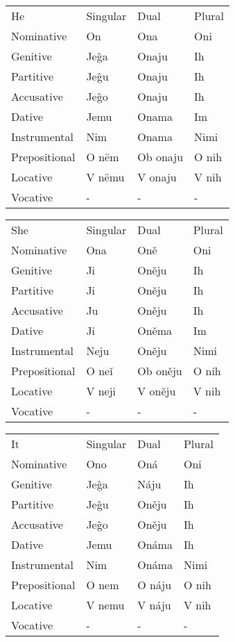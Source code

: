 \begin{table}
	\begin{tabular}{llll}
		He & Singular & Dual & Plural \\
		Nominative & On & Ona & Oni \\
		Genitive & Jeĝa & Onaju & Ih \\
		Partitive & Jeĝu & Onaju & Ih \\
		Accusative & Jeĝo & Onaju & Ih \\
		Dative & Jemu & Onama & Im \\
		Instrumental & Nim & Onama & Nimi \\
		Prepositional & O nëm & Ob onaju & O nih \\
		Locative & V nëmu & V onaju & V nih \\
		Vocative & - & - & -
	\end{tabular}
\end{table}

\begin{table}
	\begin{tabular}{llll}
		She & Singular & Dual & Plural \\
		Nominative & Ona & Oně & Oni \\
		Genitive & Ji & Oněju & Ih \\
		Partitive & Ji & Oněju & Ih \\
		Accusative & Ju & Oněju & Ih \\
		Dative & Ji & Oněma & Im \\
		Instrumental & Neju & Oněju & Nimi \\
		Prepositional & O neǐ & Ob oněju & O nih \\
		Locative & V neji & V oněju & V nih \\
		Vocative & - & - & -
	\end{tabular}
\end{table}

\begin{table}
	\begin{tabular}{llll}
		It & Singular & Dual & Plural \\
		Nominative & Ono & Oná & Oni \\
		Genitive & Jeĝa & Náju & Ih \\
		Partitive & Jeĝu & Oněju & Ih \\
		Accusative & Jeĝo & Oněju & Ih \\
		Dative & Jemu & Onáma & Ih \\
		Instrumental & Nim & Onáma & Nimi \\
		Prepositional & O nem & O náju & O nih \\
		Locative & V nemu & V náju & V nih \\
		Vocative & - & - & -
	\end{tabular}
\end{table}


